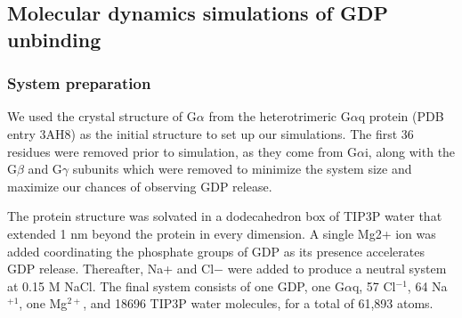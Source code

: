 \documentclass[../main.tex]{subfiles}
\begin{document}
    \subsection{Molecular dynamics simulations of GDP unbinding}
        \subsubsection{System preparation}
            We used the crystal structure of G$\alpha$ from the heterotrimeric G$\alpha$q protein (PDB entry 3AH8) as the initial structure to set up our simulations\cite{Nishimura:2010gt}. The first 36 residues were removed prior to simulation, as they come from G$\alpha$i, along with the G$\beta$ and G$\gamma$ subunits which were removed to minimize the system size and maximize our chances of observing GDP release\cite{Oldham:2008cr}.

            The protein structure was solvated in a dodecahedron box of TIP3P water\cite{Jorgensen:1983fl} that extended 1 nm beyond the protein in every dimension. A single Mg2+ ion was added coordinating the phosphate groups of GDP as its presence accelerates GDP release\cite{Zhang:2000cy}. Thereafter, Na+ and Cl$-$ were added to produce a neutral system at 0.15 M NaCl. The final system consists of one GDP, one G$\alpha$q, 57 Cl$^{-1}$, 64 Na$^{+1}$, one Mg$^{2+}$, and 18696 TIP3P water molecules, for a total of 61,893 atoms.
\end{document}

